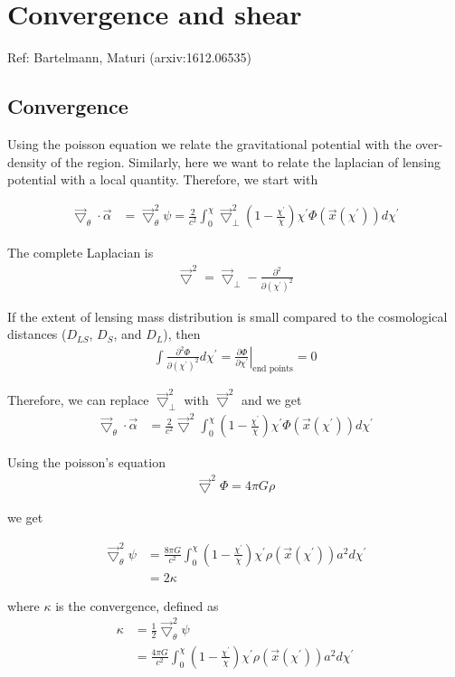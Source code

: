 \documentclass[12pt]{article}
\newcommand{\beq}{\begin{equation}}
\newcommand{\eeq}{\end{equation}}
\newcommand{\beqa}{\begin{eqnarray}}
\newcommand{\eeqa}{\end{eqnarray}}
\newcommand{\beqal}{\begin{aligned}}
\newcommand{\eeqal}{\end{aligned}}
\numberwithin{equation}{section}
\begin{document}
\section{Convergence and shear}
\begin{center}
Ref: Bartelmann, Maturi (arxiv:1612.06535)
\end{center}
\subsection{Convergence}

Using the poisson equation we relate the gravitational potential with the over-density of the region. Similarly, here we want to relate the laplacian of lensing potential with a local quantity. Therefore, we start with

\beq
\beqal
\vec{\bigtriangledown}_\theta \cdot \vec{\alpha} &= \vec{\bigtriangledown}^2_\theta \psi = \frac{2}{c^2}  \int_0^\chi \vec{\bigtriangledown}^2_\perp \left(1 -  \frac{\chi^\prime}{\chi} \right) \chi^\prime \Phi(\vec{x}(\chi^\prime)) d\chi^\prime 
\eeqal
\eeq

The complete Laplacian is 
\beqa
\vec{\bigtriangledown}^2 = \vec{\bigtriangledown}_\perp - \frac{\partial^2}{\partial (\chi^\prime)^2}
\eeqa

If the extent of lensing mass distribution is small compared to the cosmological distances ($D_{LS}$, $D_S$, and $D_L$), then
\beqa
\int \frac{\partial ^2 \Phi}{\partial (\chi^\prime)^2} d\chi^\prime = \left. \frac{\partial \Phi}{\partial \chi^\prime} \right|_{\textrm{end points}} = 0
\eeqa

Therefore, we can replace $\vec{\bigtriangledown}^2_\perp$ with $\vec{\bigtriangledown}^2$ and we get
\beq
\beqal
\vec{\bigtriangledown}_\theta \cdot \vec{\alpha} &= \frac{2}{c^2} \vec{\bigtriangledown}^2  \int_0^\chi \left(1 -  \frac{\chi^\prime}{\chi} \right) \chi^\prime \Phi(\vec{x}(\chi^\prime)) d\chi^\prime 
\eeqal
\eeq


Using the poisson's equation
\beqa
\vec{\bigtriangledown}^2 \Phi  = 4 \pi G \rho
\eeqa

we get

\beq
\beqal
\vec{\bigtriangledown}^2_\theta \psi  &= \frac{ 8 \pi G }{c^2}  \int_0^\chi \left(1 -  \frac{\chi^\prime}{\chi} \right) \chi^\prime  \rho(\vec{x}(\chi^\prime)) a^2 d\chi^\prime 
\\
& = 2\kappa
\eeqal
\eeq

where $\kappa$ is the convergence, defined as
\beq
\beqal
\kappa &= \frac{1}{2} \vec{\bigtriangledown}^2_\theta \psi
\\
&= \frac{4 \pi G }{c^2}   \int_0^\chi \left(1 -  \frac{\chi^\prime}{\chi} \right) \chi^\prime  \rho(\vec{x}(\chi^\prime)) a^2 d\chi^\prime 
\eeqal
\eeq
\end{document}
